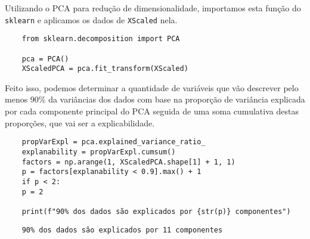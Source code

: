 Utilizando o PCA para redução de dimensionalidade, importamos esta função do \verb|sklearn| e aplicamos os dados de \verb|XScaled| nela.
\begin{longlisting}
    \begin{verbatim}
    from sklearn.decomposition import PCA

    pca = PCA()
    XScaledPCA = pca.fit_transform(XScaled)
    \end{verbatim}
\end{longlisting}

Feito isso, podemos determinar a quantidade de variáveis que vão descrever pelo menos 90\% da variâncias dos dados com base na proporção de variância explicada por cada componente principal do PCA seguida de uma soma cumulativa destas proporções, que vai ser a explicabilidade.
\begin{longlisting}
    \begin{verbatim}
    propVarExpl = pca.explained_variance_ratio_
    explanability = propVarExpl.cumsum()
    factors = np.arange(1, XScaledPCA.shape[1] + 1, 1)
    p = factors[explanability < 0.9].max() + 1
    if p < 2:
    p = 2

    print(f"90% dos dados são explicados por {str(p)} componentes")
    \end{verbatim}
\end{longlisting}
\begin{verbatim}
    90% dos dados são explicados por 11 componentes
\end{verbatim}


